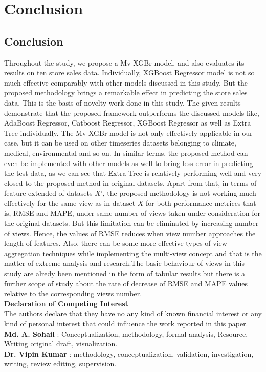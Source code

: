 
\chapter{Conclusion} %

\label{c6} %

\section{Conclusion}
Throughout the study, we propose a Mv-XGBr model, and also evaluates its results on ten store sales data. Individually, XGBoost Regressor model is not so much effective comparably with other models discussed in this study. But the proposed methodology brings a remarkable effect in predicting the store sales data. This is the basis of novelty work done in this study. The given results demonstrate that the proposed framework outperforms the discussed models like, AdaBoost Regressor, Catboost Regressor, XGBoost Regressor as well as Extra Tree individually. The Mv-XGBr model is not only effectively applicable in our case, but it can be used on other timeseries datasets belonging to climate, medical, environmental and so on.  
In similar terms, the proposed method can even be implemented with other models as well to bring less error in predicting the test data, as we can see that Extra Tree is relatively performing well and very closed to the proposed method in original datasets. Apart from that, in terms of feature extended of datasets $X’$, the proposed methodology is not working much effectively for the same view as in dataset $X$ for both performance metrices that is, RMSE and MAPE, under same number of views taken under consideration for the original datasets. But this limitation can be eliminated by increasing number of views. Hence, the values of RMSE reduces when view number approaches the length of features. Also, there can be some more effective types of view aggregation techniques while implementing the multi-view concept and that is the matter of extreme analysis and research.The basic behaviour of views in this study are alredy been mentioned in the form of tabular results but there is a further scope of study about the rate of decrease of RMSE and MAPE values relative to the corresponding views number.\\


\textbf{Declaration of Competing Interest}\\
The authors declare that they have no any kind of known financial interest or any kind of personal interest that could influence the work reported in this paper.
\textbf{Md. A. Sohail} : Conceptualization, methodology, formal analysis, Resource, Writing original draft, visualization.\\
\textbf{Dr. Vipin Kumar} : methodology, conceptualization, validation, investigation, writing, review editing, supervision.

